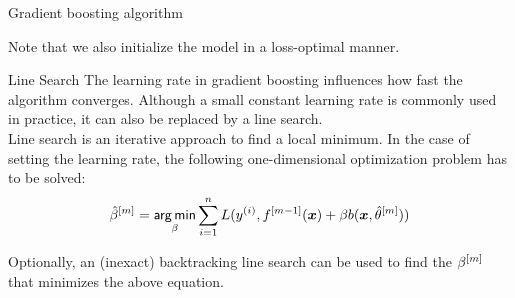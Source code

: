 \begin{vbframe}{Gradient boosting algorithm}



Note that we also initialize the model in a loss-optimal manner. %

\end{vbframe}

\begin{vbframe}{Line Search}
The learning rate in gradient boosting influences how fast the algorithm converges. 
Although a small constant learning rate is commonly used in practice, it can also be replaced by a line search.\\\lz
Line search is an iterative approach to find a local minimum. In the case of setting the learning rate, the following one-dimensional optimization problem has to be solved:
$$\hat{\beta}^{[m]} = \mathop{\sf arg\,min}_{\beta} \sum_{i=1}^n L(y^{(i)}, f^{[m-1]}(\bm{x}) + \beta b(\bm{x}, \hat{\theta}^{[m]}))$$

Optionally, an (inexact) backtracking line search can be used to find the 
$\beta^{[m]}$ that minimizes the above equation.

\end{vbframe}

\endlecture


